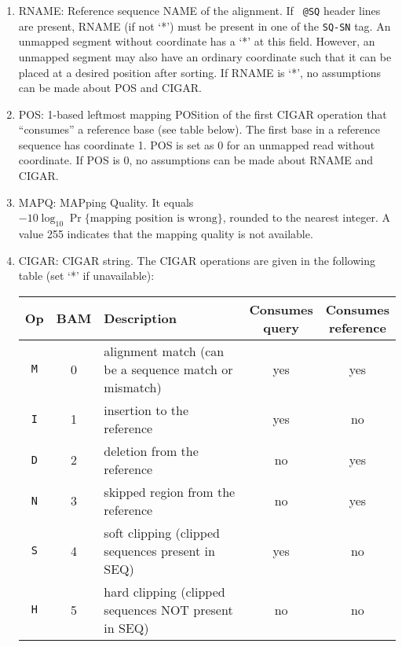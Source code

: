 \begin{enumerate}
\begin{itemize}
      \end{itemize}
    \item {\sf RNAME}: Reference sequence NAME of the alignment. If {\tt
        @SQ} header lines are present, {\sf RNAME} (if not `*') must be
      present in one of the {\tt SQ-SN} tag. An unmapped segment without
      coordinate has a `*' at this field. However, an unmapped segment may
      also have an ordinary coordinate such that it can be placed at a
      desired position after sorting. If {\sf RNAME} is `*', no assumptions
      can be made about {\sf POS} and {\sf CIGAR}.
    \item {\sf POS}: 1-based leftmost mapping POSition of the first {\sf
        CIGAR} operation that ``consumes'' a reference base (see table below).
        The first base in a reference sequence has coordinate 1. {\sf
        POS} is set as 0 for an unmapped read without coordinate. If {\sf
        POS} is 0, no assumptions can be made about {\sf RNAME} and {\sf
        CIGAR}.
    \item {\sf MAPQ}: MAPping Quality. It equals
      $-10\log_{10}\Pr\{\mbox{mapping position is wrong}\}$, rounded to the
      nearest integer. A value 255 indicates that the mapping quality is not
      available.
    \item {\sf CIGAR}: CIGAR string. The CIGAR operations are given in the
      following table (set `*' if unavailable):
      \begin{center}
      \begin{tabular}{cclcc}
      \toprule
      Op & BAM & Description & \makecell{Consumes \\ query} & \makecell{Consumes \\ reference}\\
      \midrule
      {\tt M} & 0 & alignment match (can be a sequence match or mismatch)       & yes & yes \\
      {\tt I} & 1 & insertion to the reference                                  & yes & no  \\
      {\tt D} & 2 & deletion from the reference                                 & no  & yes \\
      {\tt N} & 3 & skipped region from the reference                           & no  & yes \\
      {\tt S} & 4 & soft clipping (clipped sequences present in {\sf SEQ})      & yes & no  \\
      {\tt H} & 5 & hard clipping (clipped sequences NOT present in {\sf SEQ})  & no  & no  \\

\end{tabular}
\end{center}
\end{enumerate}
